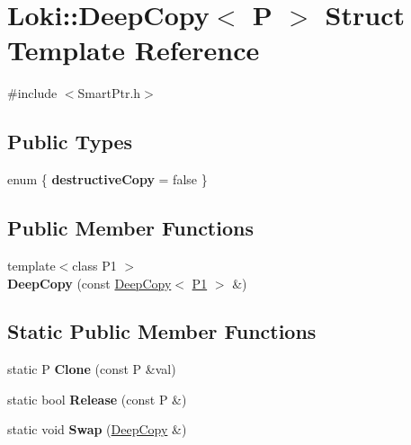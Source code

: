 \hypertarget{structLoki_1_1DeepCopy}{}\section{Loki\+:\+:Deep\+Copy$<$ P $>$ Struct Template Reference}
\label{structLoki_1_1DeepCopy}


{\ttfamily \#include $<$Smart\+Ptr.\+h$>$}

\subsection*{Public Types}
\begin{DoxyCompactItemize}
\item 
\hypertarget{structLoki_1_1DeepCopy_a5df83e3ad15e9b1578c36573e8a56219}{}enum \{ {\bfseries destructive\+Copy} = false
 \}\label{structLoki_1_1DeepCopy_a5df83e3ad15e9b1578c36573e8a56219}

\end{DoxyCompactItemize}
\subsection*{Public Member Functions}
\begin{DoxyCompactItemize}
\item 
\hypertarget{structLoki_1_1DeepCopy_a75758c8fe47537ef5343ca62914df48a}{}{\footnotesize template$<$class P1 $>$ }\\{\bfseries Deep\+Copy} (const \hyperlink{structLoki_1_1DeepCopy}{Deep\+Copy}$<$ \hyperlink{structP1}{P1} $>$ \&)\label{structLoki_1_1DeepCopy_a75758c8fe47537ef5343ca62914df48a}

\end{DoxyCompactItemize}
\subsection*{Static Public Member Functions}
\begin{DoxyCompactItemize}
\item 
\hypertarget{structLoki_1_1DeepCopy_ad91b1895b1fdc3a293d0d4ddbbbb199c}{}static P {\bfseries Clone} (const P \&val)\label{structLoki_1_1DeepCopy_ad91b1895b1fdc3a293d0d4ddbbbb199c}

\item 
\hypertarget{structLoki_1_1DeepCopy_a619b6e3dc5a89ea268423e15833c1ef8}{}static bool {\bfseries Release} (const P \&)\label{structLoki_1_1DeepCopy_a619b6e3dc5a89ea268423e15833c1ef8}

\item 
\hypertarget{structLoki_1_1DeepCopy_a1178779911a957fd4b925467f3e0f671}{}static void {\bfseries Swap} (\hyperlink{structLoki_1_1DeepCopy}{Deep\+Copy} \&)\label{structLoki_1_1DeepCopy_a1178779911a957fd4b925467f3e0f671}

\end{DoxyCompactItemize}


